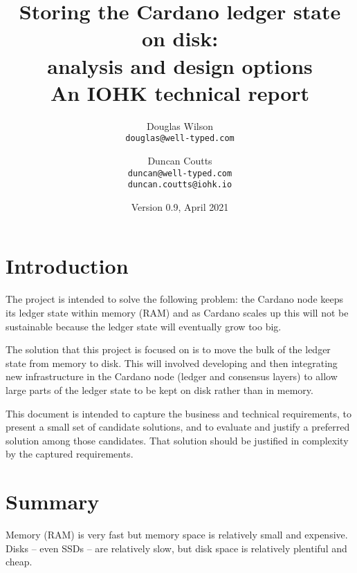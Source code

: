 \documentclass[11pt,a4paper]{article}
\begin{document}
\title{Storing the Cardano ledger state on disk: \\
       analysis and design options \\
       {\large \sc An IOHK technical report}
  }
\date{Version 0.9, April 2021}
\author{Douglas Wilson     \\ {\small \texttt{douglas@well-typed.com}} \\
   \and Duncan Coutts      \\ {\small \texttt{duncan@well-typed.com}} \\
                              {\small \texttt{duncan.coutts@iohk.io}}
   }

\maketitle


\section{Introduction}
\label{introduction}

The project is intended to solve the following problem: the Cardano node keeps
its ledger state within memory (RAM) and as Cardano scales up this will not be
sustainable because the ledger state will eventually grow too big.

The solution that this project is focused on is to move the bulk of the ledger
state from memory to disk. This will involved developing and then integrating
new infrastructure in the Cardano node (ledger and consensus layers) to allow
large parts of the ledger state to be kept on disk rather than in memory.

This document is intended to capture the business and technical requirements,
to present a small set of candidate solutions, and to evaluate and justify a
preferred solution among those candidates. That solution should be justified in
complexity by the captured requirements.

\tableofcontents

\section{Summary}
\label{summary}

Memory (RAM) is very fast but memory space is relatively small and expensive.
Disks -- even SSDs -- are relatively slow, but disk space is relatively
plentiful and cheap.
\end{document}
